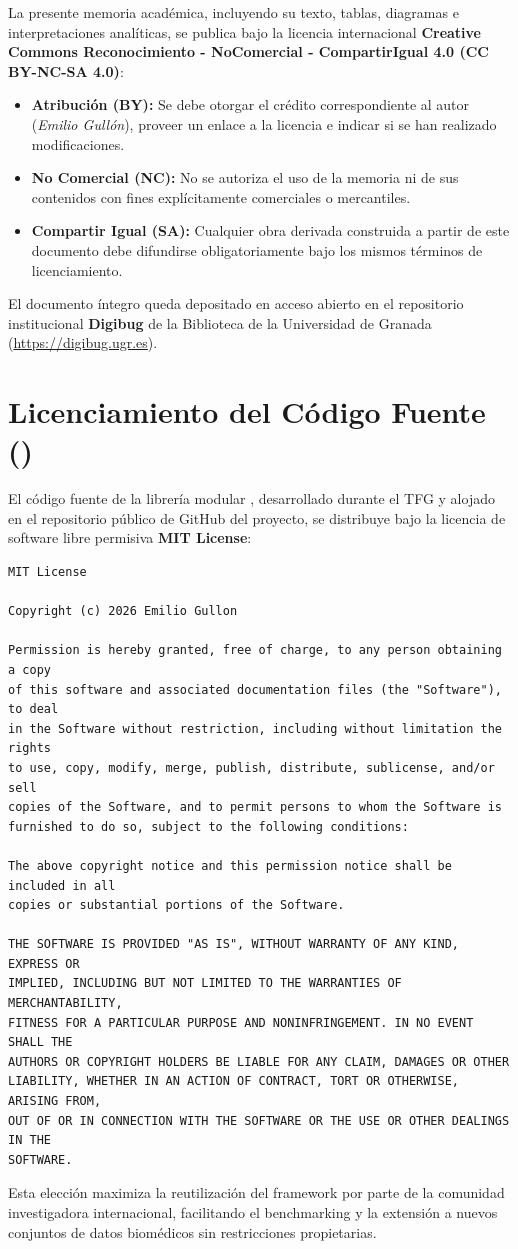 La presente memoria académica, incluyendo su texto, tablas, diagramas e interpretaciones analíticas, se publica bajo la licencia internacional \textbf{Creative Commons Reconocimiento - NoComercial - CompartirIgual 4.0 (CC BY-NC-SA 4.0)}:
\begin{itemize}
    \item \textbf{Atribución (BY):} Se debe otorgar el crédito correspondiente al autor (\emph{Emilio Gullón}), proveer un enlace a la licencia e indicar si se han realizado modificaciones.
    \item \textbf{No Comercial (NC):} No se autoriza el uso de la memoria ni de sus contenidos con fines explícitamente comerciales o mercantiles.
    \item \textbf{Compartir Igual (SA):} Cualquier obra derivada construida a partir de este documento debe difundirse obligatoriamente bajo los mismos términos de licenciamiento.
\end{itemize}

El documento íntegro queda depositado en acceso abierto en el repositorio institucional \textbf{Digibug} de la Biblioteca de la Universidad de Granada (\url{https://digibug.ugr.es}).

\section{Licenciamiento del Código Fuente ()}
\label{sec:ap_licencia_software}

El código fuente de la librería modular , desarrollado durante el TFG y alojado en el repositorio público de GitHub del proyecto, se distribuye bajo la licencia de software libre permisiva \textbf{MIT License}:

\begin{lstlisting}[style=bashstyle, caption={Texto oficial de la licencia MIT de \code{fatigueset-lib}.}]
MIT License

Copyright (c) 2026 Emilio Gullon

Permission is hereby granted, free of charge, to any person obtaining a copy
of this software and associated documentation files (the "Software"), to deal
in the Software without restriction, including without limitation the rights
to use, copy, modify, merge, publish, distribute, sublicense, and/or sell
copies of the Software, and to permit persons to whom the Software is
furnished to do so, subject to the following conditions:

The above copyright notice and this permission notice shall be included in all
copies or substantial portions of the Software.

THE SOFTWARE IS PROVIDED "AS IS", WITHOUT WARRANTY OF ANY KIND, EXPRESS OR
IMPLIED, INCLUDING BUT NOT LIMITED TO THE WARRANTIES OF MERCHANTABILITY,
FITNESS FOR A PARTICULAR PURPOSE AND NONINFRINGEMENT. IN NO EVENT SHALL THE
AUTHORS OR COPYRIGHT HOLDERS BE LIABLE FOR ANY CLAIM, DAMAGES OR OTHER
LIABILITY, WHETHER IN AN ACTION OF CONTRACT, TORT OR OTHERWISE, ARISING FROM,
OUT OF OR IN CONNECTION WITH THE SOFTWARE OR THE USE OR OTHER DEALINGS IN THE
SOFTWARE.
\end{lstlisting}

Esta elección maximiza la reutilización del framework por parte de la comunidad investigadora internacional, facilitando el benchmarking y la extensión a nuevos conjuntos de datos biomédicos sin restricciones propietarias.
